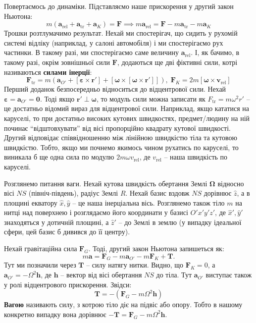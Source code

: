 \documentclass[14pt]{extarticle}
\begin{document}
Повертаємось до динаміки. Підставляємо наше прискорення у другий закон Ньютона:
\[
m(\mathbf{a}_{\text{rel}}+\mathbf{a}_{\text{tr}}+\mathbf{a}_K) = \mathbf{F} \implies m\mathbf{a}_{\text{rel}} = \mathbf{F} - m\mathbf{a}_{\text{tr}} - m\mathbf{a}_K
\]
Трошки розтлумачимо результат. Нехай ми спостерігач, що сидить у рухомій системі відліку (наприклад, у салоні автомобіля) і ми спостерігаємо рух частинки. В такому разі, ми спостерігаємо саме величину $\mathbf{a}_{\text{rel}}$. І, як бачимо, в такому разі, окрім зовнішньої сили $\mathbf{F}$, додаються ще дві фіктивні сили, котрі називаються \textbf{силами інерції}:
\[
\boxed{\mathbf{F}_{\text{tr}} = m\left(\mathbf{a}_{O'} + [\boldsymbol{\varepsilon} \times \mathbf{r}'] + [\boldsymbol{\omega} \times [\boldsymbol{\omega} \times \mathbf{r}']]\right), \; \mathbf{F}_K = 2m[\boldsymbol{\omega} \times \mathbf{v}_{\text{rel}}]}
\]
Перший доданок безпосередньо відноситься до відцентрової сили. Нехай $\boldsymbol{\varepsilon} = \mathbf{a}_{O'} = \mathbf{0}$. Тоді якщо $\mathbf{r'} \perp \boldsymbol{\omega}$, то модуль сили можна записати як $F_{\text{tr}}=m\omega^2r'$ -- це достатньо відомий вираз для відцентрової сили. Наприклад, якщо кататися на каруселі, то при достатньо високих кутових швидкостях, предмет/людину на ній починає ``відштовхувати'' від вісі пропорційно квадрату кутової швидкості. Другий відповідає співвідношенню між лінійною швидкістю тіла та кутовою швидкістю. Тобто, якщо ми почнемо якимось чином рухатись по каруселі, то виникала б ще одна сила по модулю $2m\omega v_{\text{rel}}$, де $v_{\text{rel}}$ -- наша швидкість по каруселі. 

Розглянемо питання ваги. Нехай кутова швидкість обертання Землі $\boldsymbol{\Omega}$ відносно вісі $NS$ (північ-південь), радіус Землі $R$. Нехай базис вздовж $NS$ дорівнює $\hat{z}$, а в площині екватору $\hat{x},\hat{y}$ -- це наша інерціальна вісь. Розглянемо також тіло $m$ на нитці над поверхнею і розглядаємо його координати у базисі $O'x'y'z'$, де $\hat{x}',\hat{y}'$ знаходяться у дотичній площині, а $\hat{z}'$ -- до Землі в землю (у випадку ідеальної сфери, цей базис б дивився до її центру). 

Нехай гравітаційна сила $\mathbf{F}_G$. Тоді, другий закон Ньютона запишеться як:
\[
m\mathbf{a} = \mathbf{F}_G - m\mathbf{a}_{O'} - m\mathbf{F}_K + \mathbf{T}.
\]
Тут ми позначили через $\mathbf{T}$ -- силу натягу нитки. Видно, що $\mathbf{F}_K=0$, а $\mathbf{a}_{O'} = -\Omega^2\mathbf{h}$, де $\mathbf{h}$ -- вектор від вісі обертання $NS$ до тіла. Тут $\mathbf{a}_{O'}$ виступає також у ролі відцентрового прискорення. Звідси:
\[
\mathbf{T} = -\left(\mathbf{F}_G-m\Omega^2\mathbf{h}\right)
\]
\textbf{Вагою} називають силу, з котрою тіло діє на підвіс або опору. Тобто в нашому конкретно випадку вона дорівнює $-\mathbf{T}=\mathbf{F}_G-m\Omega^2\mathbf{h}$. 
\end{document}
